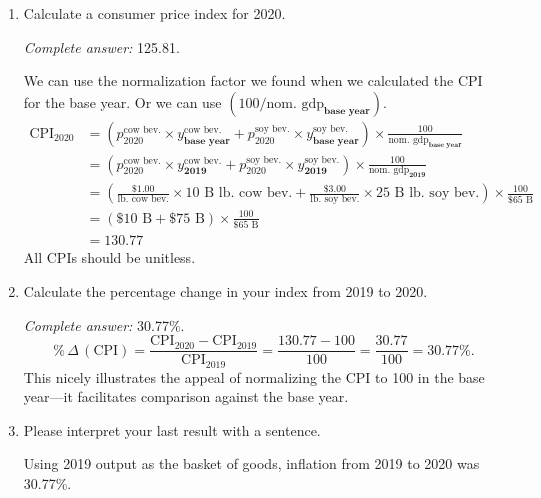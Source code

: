 \documentclass{assignment}
\begin{document}
\begin{enumerate}
\begin{enumerate}
\item Calculate a consumer price index for 2020.

\begin{solution}
\emph{Complete answer:} 125.81.

We can use the normalization factor we found when we calculated the CPI for the base year. Or we can use $(100 / \text{nom.~gdp}_{\textbf{base year}})$.
\begin{align*}
\text{CPI}_{\text{2020}} &= 
\left( p^{\text{cow bev.}}_{\text{2020}} \times y^{\text{cow bev.}}_{\textbf{base year}} +
p^{\text{soy bev.}}_{\text{2020}} \times y^{\text{soy bev.}}_{\textbf{base year}} \right) \times \frac{100}{\text{nom.~gdp}_{\textbf{base year}}} \\
 &= 
\left( p^{\text{cow bev.}}_{\text{2020}} \times y^{\text{cow bev.}}_{\textbf{2019}} +
p^{\text{soy bev.}}_{\text{2020}} \times y^{\text{soy bev.}}_{\textbf{2019}} \right) \times \frac{100}{\text{nom.~gdp}_{\textbf{2019}}} \\
 &= 
\left( \frac{\$1.00}{\text{lb.~cow bev.}} \times 10 \text{~B~lb.~cow bev.} +
\frac{\$3.00}{\text{lb.~soy bev.}} \times 25 \text{~B~lb.~soy bev.} \right) \times \frac{100}{\$65 \text{~B}} \\
 &= \left( \$10 \text{~B} + \$75 \text{~B} \right) \times \frac{100}{\$65 \text{~B}} \\
 &= 130.77
\end{align*}
All CPIs should be unitless.
\end{solution}

\item Calculate the percentage change in your index from 2019 to 2020.

\begin{solution}
\emph{Complete answer:} 30.77\%.
$$\%\,\Delta\,(\text{CPI}) = \frac{\text{CPI}_{\text{2020}} - \text{CPI}_{\text{2019}}}{\text{CPI}_{\text{2019}}} = \frac{130.77 - 100}{100} = \frac{30.77}{100} = 30.77\%.$$
This nicely illustrates the appeal of normalizing the CPI to 100 in the base year---it facilitates comparison against the base year.
\end{solution}

\item Please interpret your last result with a sentence.

\begin{solution}
Using 2019 output as the basket of goods, inflation from 2019 to 2020 was 30.77\%.
\end{solution}


\end{enumerate}
\end{enumerate}
\end{document}
